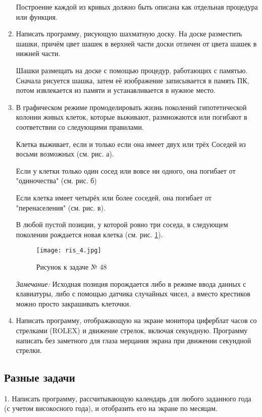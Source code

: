 \begin{enumerate}
Построение каждой из кривых должно быть описана как отдельная процедура или функция.

\item Написать программу, рисующую шахматную доску. На доске разместить шашки, причём цвет шашек в верхней части доски отличен от цвета шашек в нижней части.

Шашки размещать на доске с помощью процедур, работающих с памятью. Сначала рисуется шашка, затем её изображение записывается в память ПК, потом извлекается из памяти и устанав­ливается в нужное место.

\item В графическом режиме промоделировать жизнь поко­лений гипотетической колонии живых клеток, которые выживают, размножаются или погибают в соответствии со следующими прави­лами.

Клетка выживает, если и только если она имеет двух или трёх Соседей из восьми возможных (см. рис. а).
 
Если у клетки только один сосед или вовсе ни одного, она поги­бает от "одиночества" (см. рис. б)

Если клетка имеет четырёх или более соседей, она погибает от "перенаселения" (см. рис. в).

В любой пустой позиции, у которой ровно три соседа, в следу­ющем поколении рождается новая клетка (см. рис. \ref{ris3}).
\begin{figure}[!hb]
\centerline{
\texttt{[image: ris\_4.jpg]}}
\caption{Рисунок к задаче № 48}
\label{ris3}
\end{figure}

{\it Замечание:} Исходная позиция порождается либо в режиме вво­да данных с клавиатуры, либо с помощью датчика случайных чисел, а вместо крестиков можно просто закрашивать клеточки.

 \item Написать программу, отображающую на экране монитора циферблат часов со стрелками (ROLEX) и движение стрелок, включая секундную. Программу написать без заметного для глаза мерцания экрана при движении секундной стрелки.
 
 \end{enumerate}  

\subsection{Разные задачи}

1. Написать программу, рассчитывающую календарь для любого заданного года (с учетом високосного года), и отобразить его на экране по месяцам.

